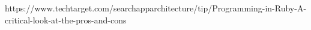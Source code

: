 https://www.techtarget.com/searchapparchitecture/tip/Programming-in-Ruby-A-critical-look-at-the-pros-and-cons